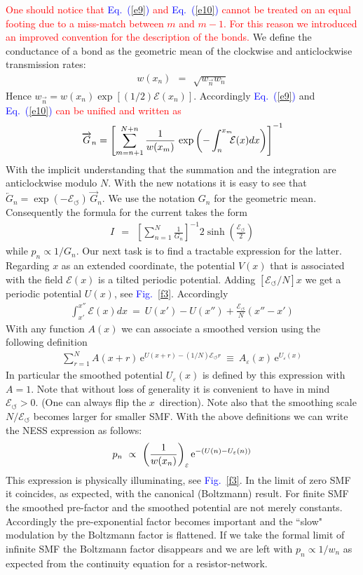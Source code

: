 \documentclass[aps,pre,floats,floatfix,twocolumn]{revtex4}
\newcommand{\eexp}{\mbox{e}^}
\newcommand{\mylabel}[1]{\label{#1}}
\newcommand{\beq}{\begin{eqnarray}}
\newcommand{\eeq}{\end{eqnarray}}
\newcommand{\be}[1]{\begin{eqnarray}\ifthenelse{#1=-1}
{\nonumber}{\ifthenelse{#1=0}{}{\mylabel{e#1}}}}
\newcommand{\Eq}[1]{\textcolor{blue}{Eq.\!\!~(\ref{#1})}}
\newcommand{\Fig}[1]{\textcolor{blue}{Fig.}\!\!~\ref{#1}}
\newcommand{\rmrk}[1]{\textcolor{red}{#1}}
\begin{document}
\rmrk{One should notice that \Eq{e9} and \Eq{e10} cannot 
be treated on an equal footing due to a miss-match 
between $m$ and $m{-}1$. For this reason 
we introduced an improved convention for the description 
of the bonds.}  
We define the conductance of a bond as the geometric mean 
of the clockwise and anticlockwise transmission rates: 
%
\beq  
w(x_n) \ \ = \ \ \sqrt{ w_{\overrightarrow{n}} w_{\overleftarrow{n}} }
\eeq
%
Hence $w_{\overrightarrow{n}} = w(x_n) \exp[(1/2)\mathcal{E}(x_n)]$.
Accordingly  \Eq{e9} and \Eq{e10} \rmrk{can be unified and written as} 
%
%
\be{13}
\overrightarrow{G}_n = \left[ \sum_{m=n+1}^{N+n} \frac{1}{w(x_m)} 
\,\exp\left(-\int_{n}^{x_m} \!\!\!\mathcal{E}(x)dx \right) \right]^{-1} 
\eeq
%
With the implicit understanding that the summation and the integration 
are anticlockwise modulo $N$. With the new notations it is easy to see 
that ${\overleftarrow{G}_n = \exp(-\mathcal{E}_{\circlearrowleft}) \, \overrightarrow{G}_n}$.
We use the notation $G_n$ for the geometric mean. Consequently 
the formula for the current takes the form 
%
\beq
I \ \ = \ \ \left[\sum_{n=1}^N \frac{1}{G_n}\right]^{-1} 2\sinh\left(\frac{\mathcal{E}_{\circlearrowleft}}{2}\right)
\eeq 
%
while $p_n\propto 1/G_n$. Our next task is to find a tractable
expression for the latter. Regarding $x$ as an extended coordinate, 
the potential $V(x)$ that is associated with the field $\mathcal{E}(x)$ 
is a tilted periodic potential. Adding $[\mathcal{E}_{\circlearrowleft}/N] x$
we get a periodic potential $U(x)$, see \Fig{f3}. Accordingly 
%
\beq
\int_{x'}^{x''} \!\!\!\mathcal{E}(x)dx \ = \ U(x'){-}U(x'') + \frac{\mathcal{E}_{\circlearrowleft}}{N}(x''{-}x')
\eeq  
%
With any function $A(x)$ we can associate a smoothed version 
using the following definition  
%
\beq
\sum_{r=1}^N A(x{+}r) \, \eexp{U(x{+}r)- (1/N)\mathcal{E}_{\circlearrowleft}r} \ \equiv \ A_{\varepsilon}(x) \, \eexp{U_{\varepsilon}(x)} 
\eeq
%
In particular the smoothed potential $U_{\varepsilon}(x)$ is defined by this expression with ${A=1}$. 
Note that without loss of generality it is convenient to have 
in mind ${\mathcal{E}_{\circlearrowleft}>0}$. (One can always flip the $x$~direction).  
Note also that the smoothing scale $N/\mathcal{E}_{\circlearrowleft}$ becomes larger for smaller SMF.
With the above definitions we can write the NESS expression as follows:
%
\be{17}
p_n \ \propto \ \left( \frac{1}{w(x_n)} \right)_{\varepsilon} \eexp{-(U(n)-U_{\varepsilon}(n))}
\eeq
%
This expression is physically illuminating, see \Fig{f3}. 
In the limit of zero SMF it coincides, as expected, 
with the canonical (Boltzmann) result. 
For finite SMF the smoothed pre-factor and the smoothed potential
are not merely constants. Accordingly the pre-exponential factor
becomes important and the ``slow" modulation by the Boltzmann factor 
is flattened. If we take the formal limit of infinite SMF 
the Boltzmann factor disappears and we are left with ${p_n \propto 1/w_n}$    
as expected from the continuity equation for a resistor-network. 
\end{document}

